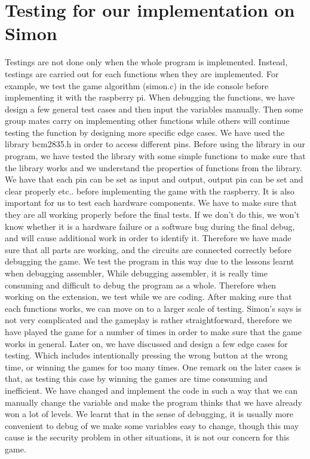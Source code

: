 \documentclass[11pt]{article}
\begin{document}
\section{Testing for our implementation on Simon}
Testings are not done only when the whole program is implemented. Instead, testings are carried out for each functions when they are implemented. For example, we test the game algorithm (simon.c) in the ide console before implementing it with the raspberry pi.\newline \newline
When debugging the functions, we have design a few general test cases and then input the variables manually. Then some group mates carry on implementing other functions while others will continue testing the function by designing more specific edge cases.\newline \newline
We have used the library bcm2835.h in order to access different pins. Before using the library in our program, we have tested the library with some simple functions to make sure that the library works and we understand the properties of functions from the library. We have that each pin can be set as input and output, output pin can be set and clear properly etc.. before implementing the game with the raspberry.\newline \newline
It is also important for us to test each hardware components. We have to make sure that they are all working properly before the final tests. If we don't do this, we won't know whether it is a hardware failure or a software bug during the final debug, and will cause additional work in order to identify it. Therefore we have made sure that all parts are working, and the circuits are connected correctly before debugging the game.\newline \newline
We test the program in this way due to the lessons learnt when debugging assembler, While debugging assembler, it is really time consuming and difficult to debug the program as a whole. Therefore when working on the extension, we test while we are coding.\newline \newline
After making sure that each functions works, we can move on to a larger scale of testing. Simon’s says is not very complicated and the gameplay is rather straightforward, therefore we have played the game for a number of times in order to make sure that the game works in general.\newline 
Later on, we have discussed and design a few edge cases for testing. Which includes intentionally pressing the wrong button at the wrong time, or winning the games for too many times. One remark on the later cases is that, as testing this case by winning the games are time consuming and inefficient. We have changed and implement the code in such a way that we can manually change the variable and make the program thinks that we have already won a lot of levels. We learnt that in the sense of debugging, it is usually more convenient to debug of we make some variables easy to change, though this may cause is the security problem in other situations, it is not our concern for this game.
\end{document}
